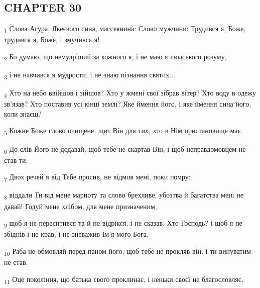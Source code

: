 \subsection{CHAPTER 30}
\begin{tcolorbox}
\textsubscript{1} Слова Агура, Якеєвого сина, массеянина: Слово мужчини: Трудився я, Боже, трудився я, Боже, і змучився я!
\end{tcolorbox}
\begin{tcolorbox}
\textsubscript{2} Бо думаю, що немудріший за кожного я, і не маю я людського розуму,
\end{tcolorbox}
\begin{tcolorbox}
\textsubscript{3} і не навчився я мудрости, і не знаю пізнання святих...
\end{tcolorbox}
\begin{tcolorbox}
\textsubscript{4} Хто на небо ввійшов і зійшов? Хто у жмені свої зібрав вітер? Хто воду в одежу зв'язав? Хто поставив усі кінці землі? Яке ймення його, і яке ймення сина його, коли знаєш?
\end{tcolorbox}
\begin{tcolorbox}
\textsubscript{5} Кожне Боже слово очищене, щит Він для тих, хто в Нім пристановище має.
\end{tcolorbox}
\begin{tcolorbox}
\textsubscript{6} До слів Його не додавай, щоб тебе не скартав Він, і щоб неправдомовцем не став ти.
\end{tcolorbox}
\begin{tcolorbox}
\textsubscript{7} Двох речей я від Тебе просив, не відмов мені, поки помру:
\end{tcolorbox}
\begin{tcolorbox}
\textsubscript{8} віддали Ти від мене марноту та слово брехливе, убозтва й багатства мені не давай! Годуй мене хлібом, для мене призначеним,
\end{tcolorbox}
\begin{tcolorbox}
\textsubscript{9} щоб я не переситився та й не відрікся, і не сказав: Хто Господь? і щоб я не збіднів і не крав, і не зневажив Ім'я мого Бога.
\end{tcolorbox}
\begin{tcolorbox}
\textsubscript{10} Раба не обмовляй перед паном його, щоб тебе не прокляв він, і ти винуватим не став.
\end{tcolorbox}
\begin{tcolorbox}
\textsubscript{11} Оце покоління, що батька свого проклинає, і неньки своєї не благословляє,
\end{tcolorbox}
